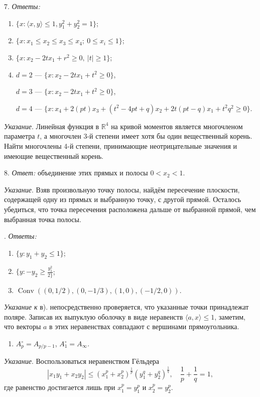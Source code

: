 	7. \textit{Ответы:} 
	\begin{enumerate}[label=\asbuk*)]
		\item $\{x : \langle x,y \rangle \le 1, y_1^2 + y_2^2 = 1\}$;  
		\item $\{x : x_1 \le x_2 \le x_3 \le x_4;\ 0 \le x_i \le 1\}$;  
		\item $\{x : x_2 - 2tx_1 + r^2 \ge 0,\ |t| \ge 1\}$;  
		\item
	$d=2$ — $\{x : x_2 - 2tx_1 + t^2 \ge 0\}$,

	$d=3$ — $\{x : x_2 - 2tx_1 + t^2 \ge 0\}$,  

	$d=4$ — $\{x : x_4 + 2(pt)x_3 + (t^2 - 4pt + q)x_2 + 2t(pt - q)x_1 + t^2 q^2 \ge 0\}$.  
	\end{enumerate}
	\textit{Указание}. Линейная функция в $\mathbb{R}^4$ на кривой моментов является многочленом параметра $t$, а многочлен 3-й степени имеет хотя бы один вещественный корень. Найти многочлены 4-й степени, принимающие неотрицательные значения и имеющие вещественный корень.

	8. \textit{Ответ:} объединение этих прямых и полосы $0 < x_2 < 1$. 

	\textit{Указание}. Взяв произвольную точку полосы, найдём пересечение плоскости, содержащей одну из прямых и выбранную точку, с другой прямой. Осталось убедиться, что точка пересечения расположена дальше от выбранной прямой, чем выбранная точка полосы.

	. \textit{Ответы:}  
	\begin{enumerate}[label=\asbuk*)]
		\item $\{y : y_1 + y_2 \le 1\}$;  
		\item $\{y : -y_2 \ge \frac{y_1^2}{2\}}$;  
		\item $\operatorname{Conv}\left((0,1/2),(0,-1/3),(1,0),(-1/2,0)\right)$.
	\end{enumerate}
	\textit{Указание к} в). непосредственно проверяется, что указанные точки принадлежат поляре. Записав их выпуклую оболочку в виде неравенств $\langle a, x \rangle \le 1$, заметим, что векторы $a$ в этих неравенствах совпадают с вершинами прямоугольника.
	\begin{enumerate}[resume*]
		\item $A_p^\circ = A_{p/{p-1}}$, $A_1^\circ = A_\infty$.
	\end{enumerate}
	\textit{Указание}. Воспользоваться неравенством Гёльдера 
	\[
		|x_1 y_1 + x_2 y_2| \le (x_1^p + x_2^p)^{\frac{1}{p}} (y_1^q + y_2^q)^{\frac{1}{q}}, \quad \frac{1}{p} + \frac{1}{q} = 1,
	\]
	где равенство достигается лишь при $x_1^p = y_1^p$ и $x_2^p = y_2^p$.
% 
